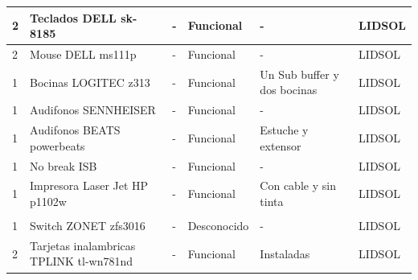 \documentclass[a4paper,11pt]{article}                 %
\begin{document}
\begin{longtable}{|p{}|p{}|p{}|p{}|p{}|p{}|}
2                          & Teclados DELL sk-8185         & -                                                                            & Funcional                & -                             & LIDSOL                        \\ \hline
2                          & Mouse DELL ms111p             & -                                                                            & Funcional                & -                             & LIDSOL                        \\ \hline
1                          & Bocinas LOGITEC z313          & -                                                                            & Funcional                & Un Sub buffer y dos bocinas   & LIDSOL                        \\ \hline
1                          & Audifonos SENNHEISER          & -                                                                            & Funcional                & -                             & LIDSOL                        \\ \hline
1                          & Audifonos BEATS powerbeats    & -                                                                            & Funcional                & Estuche y extensor            & LIDSOL                        \\ \hline
1                          & No break ISB                  & -                                                                            & Funcional                & -                             & LIDSOL                        \\ \hline
1                          & Impresora Laser Jet HP p1102w & -                                                                            & Funcional                & Con cable y sin tinta         & LIDSOL                        \\ \hline
\multicolumn{6}{|l|}{\cellcolor[HTML]{EFEFEF}{\color[HTML]{343434} Redes}}                                                                                                                                                                                                \\ \hline
1                          & Switch ZONET zfs3016                    & -                                                                            & Desconocido              & -                                                        & LIDSOL                        \\ \hline
2                          & Tarjetas inalambricas TPLINK tl-wn781nd & -                                                                            & Funcional                & Instaladas                                               & LIDSOL                        \\ \hline

\end{longtable}
\end{document}
